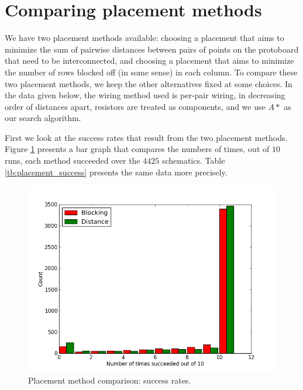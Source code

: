 \section{Comparing placement methods}
\label{sec:compare_placement}

We have two placement methods available: choosing a placement that aims to
minimize the sum of pairwise distances between pairs of points on the protoboard
that need to be interconnected, and choosing a placement that aims to minimize
the number of rows blocked off (in some sense) in each column. To compare these
two placement methods, we keep the other alternatives fixed at some choices.
In the data given below, the wiring method used is per-pair wiring, in decreasing
order of distances apart, resistors are treated as components, and we use $A*$ as
our search algorithm.

First we look at the success rates that result from the two placement methods.
Figure \ref{fig:placement_success} presents a bar graph that compares the numbers
of times, out of $10$ runs, each method succeeded over the $4425$ schematics.
Table \ref{tb:placement_success} presents the same data more precisely.

\begin{figure}[H]
\begin{center}
\includegraphics[width=\textwidth]{Images/placement_success_comparison.png}
\caption{Placement method comparison: success rates.}
\label{fig:placement_success}
\end{center}
\end{figure}

